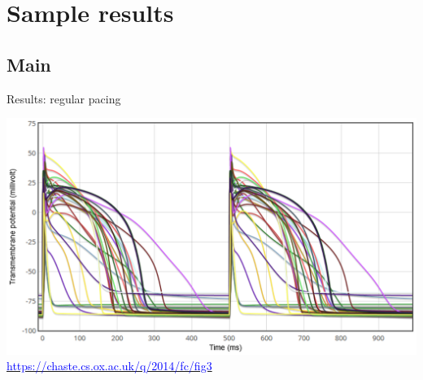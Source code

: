 \documentclass[t,xcolor={usenames,dvipsnames}]{beamer}
\newcommand{\myhref}[2]{\href{#1}{\textcolor{Blue}{#2}}}
\newcommand{\myurl}[1]{\myhref{#1}{#1}}
\begin{document}
\section{Sample results}
\subsection*{Main}

\begin{frame}{Results: regular pacing}
\begin{center}
\includegraphics[width=\textwidth]{weblab_fig3}\\
\tiny\myurl{https://chaste.cs.ox.ac.uk/q/2014/fc/fig3}
\end{center}
\end{frame}
\end{document}
